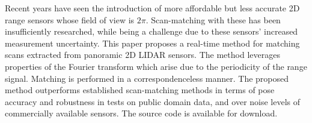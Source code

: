 Recent years have seen the introduction of more affordable but less accurate 2D
range sensors whose field of view is $2\pi$. Scan-matching with these has been
insufficiently researched, while being a challenge due to these sensors'
increased measurement uncertainty. This paper proposes a real-time method for
matching scans extracted from panoramic 2D LIDAR sensors. The method leverages
properties of the Fourier transform which arise due to the periodicity of the
range signal.  Matching is performed in a correspondenceless manner. The
proposed method outperforms established scan-matching methods in terms of pose
accuracy and robustness in tests on public domain data, and over noise levels
of commercially available sensors. The source code is available for download.
